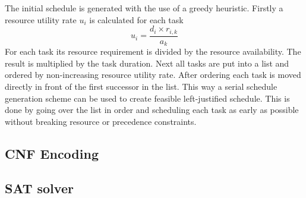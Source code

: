 The initial schedule is generated with the use of a greedy heuristic. Firstly a resource utility rate \(u_i\) is calculated for each task 
\begin{equation}
u_i=\frac{d_i \times r_{i,k}}{a_k} 
\end{equation}
For each task its resource requirement is divided by the resource availability. The result is multiplied by the task duration. Next all tasks are put into a list and ordered by non-increasing resource utility rate. After ordering each task is moved directly in front of the first successor in the list. This way a serial schedule generation scheme can be used to create feasible left-justified schedule. This is done by going over the list in order and scheduling each task as early as possible without breaking resource or precedence constraints.


\subsection{CNF Encoding}




\subsection{SAT solver}
